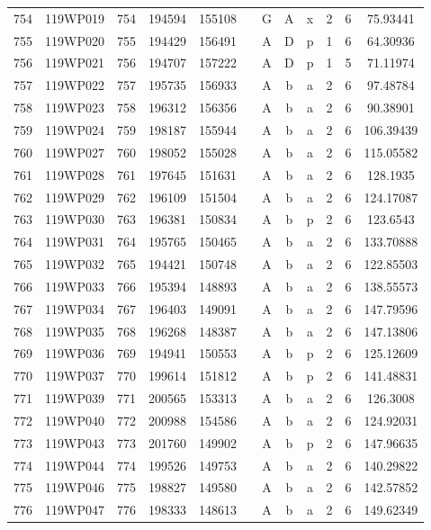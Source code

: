 \begin{tabular}{|*{12}{c|}}
754 & 119WP019 & 754 & 194594 & 155108 &  & G & A & x & 2 & 6 & 75.93441 \\ 
755 & 119WP020 & 755 & 194429 & 156491 &  & A & D & p & 1 & 6 & 64.30936 \\ 
756 & 119WP021 & 756 & 194707 & 157222 &  & A & D & p & 1 & 5 & 71.11974 \\ 
757 & 119WP022 & 757 & 195735 & 156933 &  & A & b & a & 2 & 6 & 97.48784 \\ 
758 & 119WP023 & 758 & 196312 & 156356 &  & A & b & a & 2 & 6 & 90.38901 \\ 
759 & 119WP024 & 759 & 198187 & 155944 &  & A & b & a & 2 & 6 & 106.39439 \\ 
760 & 119WP027 & 760 & 198052 & 155028 &  & A & b & a & 2 & 6 & 115.05582 \\ 
761 & 119WP028 & 761 & 197645 & 151631 &  & A & b & a & 2 & 6 & 128.1935 \\ 
762 & 119WP029 & 762 & 196109 & 151504 &  & A & b & a & 2 & 6 & 124.17087 \\ 
763 & 119WP030 & 763 & 196381 & 150834 &  & A & b & p & 2 & 6 & 123.6543 \\ 
764 & 119WP031 & 764 & 195765 & 150465 &  & A & b & a & 2 & 6 & 133.70888 \\ 
765 & 119WP032 & 765 & 194421 & 150748 &  & A & b & a & 2 & 6 & 122.85503 \\ 
766 & 119WP033 & 766 & 195394 & 148893 &  & A & b & a & 2 & 6 & 138.55573 \\ 
767 & 119WP034 & 767 & 196403 & 149091 &  & A & b & a & 2 & 6 & 147.79596 \\ 
768 & 119WP035 & 768 & 196268 & 148387 &  & A & b & a & 2 & 6 & 147.13806 \\ 
769 & 119WP036 & 769 & 194941 & 150553 &  & A & b & p & 2 & 6 & 125.12609 \\ 
770 & 119WP037 & 770 & 199614 & 151812 &  & A & b & p & 2 & 6 & 141.48831 \\ 
771 & 119WP039 & 771 & 200565 & 153313 &  & A & b & a & 2 & 6 & 126.3008 \\ 
772 & 119WP040 & 772 & 200988 & 154586 &  & A & b & a & 2 & 6 & 124.92031 \\ 
773 & 119WP043 & 773 & 201760 & 149902 &  & A & b & p & 2 & 6 & 147.96635 \\ 
774 & 119WP044 & 774 & 199526 & 149753 &  & A & b & a & 2 & 6 & 140.29822 \\ 
775 & 119WP046 & 775 & 198827 & 149580 &  & A & b & a & 2 & 6 & 142.57852 \\ 
776 & 119WP047 & 776 & 198333 & 148613 &  & A & b & a & 2 & 6 & 149.62349 \\ 

\end{tabular}
